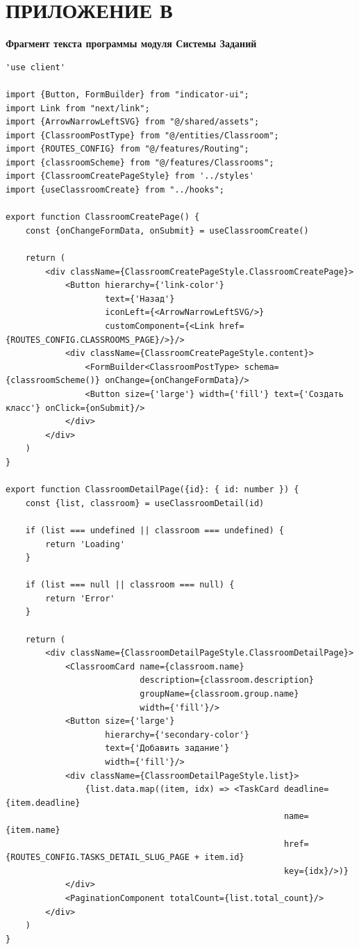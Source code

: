   \section*{ПРИЛОЖЕНИЕ В}
\endgroup
{}
\begin{center}
\textbf{Фрагмент текста программы модуля Системы Заданий}
\end{center}

\begin{lstlisting}
'use client'

import {Button, FormBuilder} from "indicator-ui";
import Link from "next/link";
import {ArrowNarrowLeftSVG} from "@/shared/assets";
import {ClassroomPostType} from "@/entities/Classroom";
import {ROUTES_CONFIG} from "@/features/Routing";
import {classroomScheme} from "@/features/Classrooms";
import {ClassroomCreatePageStyle} from '../styles'
import {useClassroomCreate} from "../hooks";

export function ClassroomCreatePage() {
    const {onChangeFormData, onSubmit} = useClassroomCreate()

    return (
        <div className={ClassroomCreatePageStyle.ClassroomCreatePage}>
            <Button hierarchy={'link-color'}
                    text={'Назад'}
                    iconLeft={<ArrowNarrowLeftSVG/>}
                    customComponent={<Link href={ROUTES_CONFIG.CLASSROOMS_PAGE}/>}/>
            <div className={ClassroomCreatePageStyle.content}>
                <FormBuilder<ClassroomPostType> schema={classroomScheme()} onChange={onChangeFormData}/>
                <Button size={'large'} width={'fill'} text={'Создать класс'} onClick={onSubmit}/>
            </div>
        </div>
    )
}

export function ClassroomDetailPage({id}: { id: number }) {
    const {list, classroom} = useClassroomDetail(id)

    if (list === undefined || classroom === undefined) {
        return 'Loading'
    }

    if (list === null || classroom === null) {
        return 'Error'
    }

    return (
        <div className={ClassroomDetailPageStyle.ClassroomDetailPage}>
            <ClassroomCard name={classroom.name}
                           description={classroom.description}
                           groupName={classroom.group.name}
                           width={'fill'}/>
            <Button size={'large'}
                    hierarchy={'secondary-color'}
                    text={'Добавить задание'}
                    width={'fill'}/>
            <div className={ClassroomDetailPageStyle.list}>
                {list.data.map((item, idx) => <TaskCard deadline={item.deadline}
                                                        name={item.name}
                                                        href={ROUTES_CONFIG.TASKS_DETAIL_SLUG_PAGE + item.id}
                                                        key={idx}/>)}
            </div>
            <PaginationComponent totalCount={list.total_count}/>
        </div>
    )
}


\end{lstlisting}
